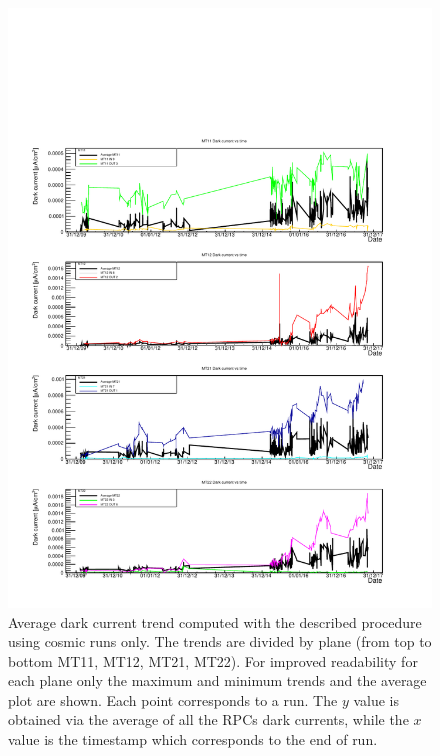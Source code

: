 \begin{figure}[!t]
\begin{center}
\includegraphics[width=0.95\linewidth]{Chapters/Performance/Figs/iDark_COSMIC_minmax.pdf}
\caption{Average dark current trend computed with the described procedure using cosmic runs only. The trends are divided by plane (from top to bottom MT11, MT12, MT21, MT22). For improved readability for each plane only the maximum and minimum trends and the average plot are shown. Each point corresponds to a run. The $y$ value is obtained via the average of all the RPCs dark currents, while the $x$ value is the timestamp which corresponds to the end of run.}
\label{fig:iDarkCOSMIC}
\end{center}
\end{figure}

